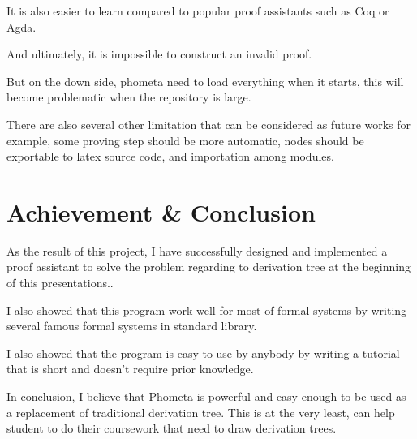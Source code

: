 \documentclass[11pt, a4paper]{article}
\begin{document}
It is also easier to learn compared to popular proof assistants such as Coq or Agda.

And ultimately, it is impossible to construct an invalid proof.

But on the down side, phometa need to load everything when it starts, this will
become problematic when the repository is large.

There are also several other limitation that can be considered as future works
for example, some proving step should be more automatic, nodes should be
exportable to latex source code, and importation among modules.

\section{Achievement \& Conclusion}

As the result of this project, I have successfully designed and implemented a
proof assistant to solve the problem regarding to derivation tree at the
beginning of this presentations..

I also showed that this program work well for most of formal systems by writing
several famous formal systems in standard library.

I also showed that the program is easy to use by anybody by
writing a tutorial that is short and doesn't require prior knowledge.

In conclusion, I believe that Phometa is powerful and easy enough to be used as
a replacement of traditional derivation tree. This is at the very least, can
help student to do their coursework that need to draw derivation trees.



\end{document}
